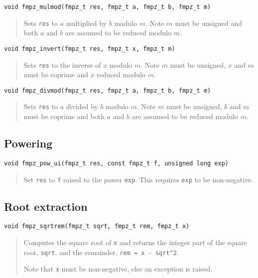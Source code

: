 \documentclass[a4paper,10pt]{article}
\newcommand{\code}{\lstinline}
\begin{document}
\begin{lstlisting}
void fmpz_mulmod(fmpz_t res, fmpz_t a, fmpz_t b, fmpz_t m) 
\end{lstlisting}
\begin{quote}
Sets \code{res} to $a$ multiplied by $b$ modulo $m$. Note $m$ must be unsigned and both $a$ and $b$ are assumed to be reduced modulo $m$.
\end{quote}

\begin{lstlisting}
void fmpz_invert(fmpz_t res, fmpz_t x, fmpz_t m) 
\end{lstlisting}
\begin{quote}
Sets \code{res} to the inverse of $x$ modulo $m$. Note $m$ must be unsigned, $x$ and $m$ must be coprime and $x$ reduced modulo $m$.
\end{quote}

\begin{lstlisting}
void fmpz_divmod(fmpz_t res, fmpz_t a, fmpz_t b, fmpz_t m) 
\end{lstlisting}
\begin{quote}
Sets \code{res} to $a$ divided by $b$ modulo $m$. Note $m$ must be unsigned, $b$ and $m$ must be coprime and both $a$ and $b$ are assumed to be reduced modulo $m$.
\end{quote}

\subsection{Powering}

\begin{lstlisting}
void fmpz_pow_ui(fmpz_t res, const fmpz_t f, unsigned long exp)
\end{lstlisting}
\begin{quote}
Set \code{res} to \code{f} raised to the power \code{exp}. This requires \code{exp} to be non-negative.
\end{quote}

\subsection{Root extraction}

\begin{lstlisting}
void fmpz_sqrtrem(fmpz_t sqrt, fmpz_t rem, fmpz_t x)
\end{lstlisting}
\begin{quote}
Computes the square root of \code{x} and returns the integer part of the square root, \code{sqrt}, and the remainder, \code{rem = x - sqrt^2}. 

Note that \code{x} must be non-negative, else an exception is raised.
\end{quote}
\end{document}
